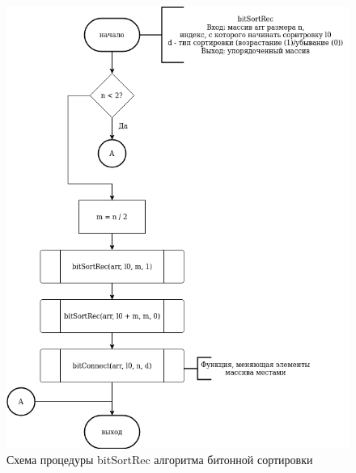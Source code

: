 \documentclass[12pt]{report}
\begin{document}
	\begin{figure}[h]
		\centering
		\includegraphics[width=0.9\linewidth]{bitonic_2}
		\caption{Схема процедуры bitSortRec алгоритма битонной сортировки}
		\label{fig:schema_insertion}
	\end{figure}
	
\end{document}
